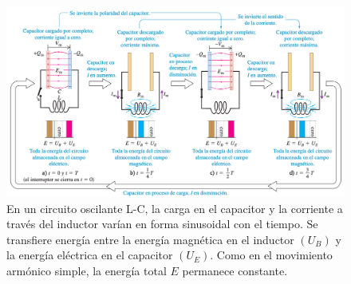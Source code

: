 \begin{figure}[h]
\centering
\includegraphics[scale=0.4]{fig/circuito-l-c}
\caption{En un circuito oscilante L-C, la carga en el capacitor y la corriente a través del inductor varían en forma sinusoidal con el tiempo. Se transfiere energía entre la energía magnética en el inductor $(U_B)$ y la energía eléctrica en el capacitor $(U_E)$. Como en el movimiento armónico simple, la energía total $E$ permanece constante.}
\label{fig:circuito-l-c}
\end{figure}

